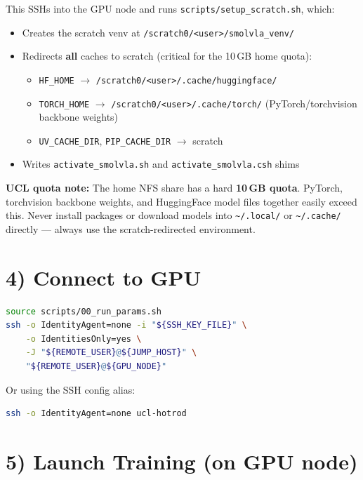 \documentclass[11pt, a4paper]{article}
\begin{document}
This SSHs into the GPU node and runs \texttt{scripts/setup\_scratch.sh}, which:
\begin{itemize}
    \item Creates the scratch venv at \texttt{/scratch0/<user>/smolvla\_venv/}
    \item Redirects \textbf{all} caches to scratch (critical for the 10\,GB home quota):
    \begin{itemize}
        \item \texttt{HF\_HOME} $\to$ \texttt{/scratch0/<user>/.cache/huggingface/}
        \item \texttt{TORCH\_HOME} $\to$ \texttt{/scratch0/<user>/.cache/torch/}
              (PyTorch/torchvision backbone weights)
        \item \texttt{UV\_CACHE\_DIR}, \texttt{PIP\_CACHE\_DIR} $\to$ scratch
    \end{itemize}
    \item Writes \texttt{activate\_smolvla.sh} and \texttt{activate\_smolvla.csh} shims
\end{itemize}

\noindent\textbf{UCL quota note:} The home NFS share has a hard \textbf{10\,GB quota}.
PyTorch, torchvision backbone weights, and HuggingFace model files together
easily exceed this. Never install packages or download models into \texttt{\textasciitilde/.local/}
or \texttt{\textasciitilde/.cache/} directly --- always use the scratch-redirected environment.

\section{4) Connect to GPU}

\begin{lstlisting}[language=bash]
source scripts/00_run_params.sh
ssh -o IdentityAgent=none -i "${SSH_KEY_FILE}" \
    -o IdentitiesOnly=yes \
    -J "${REMOTE_USER}@${JUMP_HOST}" \
    "${REMOTE_USER}@${GPU_NODE}"
\end{lstlisting}

Or using the SSH config alias:
\begin{lstlisting}[language=bash]
ssh -o IdentityAgent=none ucl-hotrod
\end{lstlisting}

\section{5) Launch Training (on GPU node)}
\end{document}
